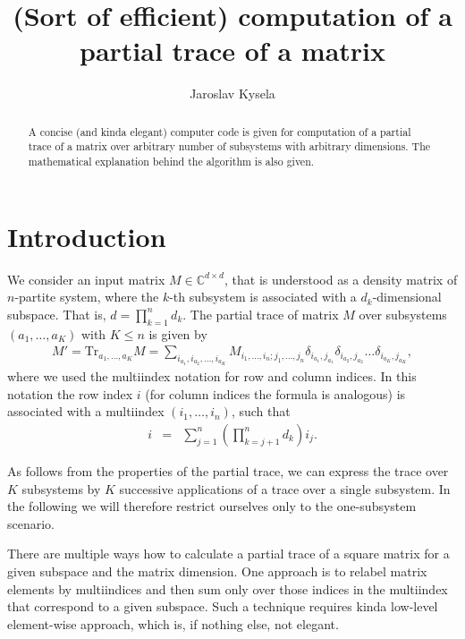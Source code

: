 \documentclass[nofootinbib,superscriptaddress,longbibliography,a4paper,amsfonts]{revtex4-2}
\begin{document}
\title{(Sort of efficient) computation of a partial trace of a matrix}
\author{Jaroslav Kysela}
\begin{abstract}
    A concise (and kinda elegant) computer code is given for computation of a partial trace of a matrix over arbitrary number of subsystems with arbitrary dimensions. The mathematical explanation behind the algorithm is also given.
\end{abstract}

\maketitle

\section{Introduction}

We consider an input matrix $M \in \mathbb{C}^{d \times d}$, that is understood as a density matrix of $n$-partite system, where the $k$-th subsystem is associated with a $d_k$-dimensional subspace. That is, $d = \prod_{k=1}^n d_k$. The partial trace of matrix $M$ over subsystems $(a_1, \ldots, a_K)$ with $K \leq n$ is given by
\begin{eqnarray}
M' = \mathrm{Tr}_{a_1, \ldots, a_K}M = \sum_{i_{a_1}, i_{a_2}, \ldots, i_{a_K}} M_{i_1, \ldots, i_n; j_1, \ldots, j_n} \delta_{i_{a_1}, j_{a_1}} \delta_{i_{a_2}, j_{a_2}} \ldots \delta_{i_{a_K}, j_{a_K}},
\end{eqnarray}
where we used the multiindex notation for row and column indices. In this notation the row index $i$ (for column indices the formula is analogous) is associated with a multiindex $(i_1, \ldots, i_n)$, such that
\begin{eqnarray}
i & = & \sum_{j=1}^{n} \left( \prod_{k=j+1}^n d_k \right) i_j.
\label{eq:multi}
\end{eqnarray}

As follows from the properties of the partial trace, we can express the trace over $K$ subsystems by $K$ successive applications of a trace over a single subsystem. In the following we will therefore restrict ourselves only to the one-subsystem scenario.

There are multiple ways how to calculate a partial trace of a square matrix for a given subspace and the matrix dimension. One approach is to relabel matrix elements by multiindices and then sum only over those indices in the multiindex that correspond to a given subspace. Such a technique requires kinda low-level element-wise approach, which is, if nothing else, not elegant. 
\end{document}
